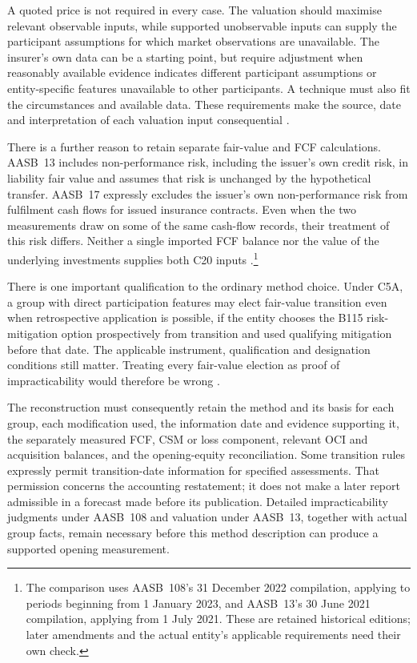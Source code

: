 A quoted price is not required in every case. The valuation should maximise
relevant observable inputs, while supported unobservable inputs can supply
the participant assumptions for which market observations are unavailable.
The insurer's own data can be a starting point, but require adjustment when
reasonably available evidence indicates different participant assumptions or
entity-specific features unavailable to other participants. A technique must
also fit the circumstances and available data. These requirements make the
source, date and interpretation of each valuation input consequential
\citep[paragraphs~61--67 and 87--89]{aasb13comp2021}.

There is a further reason to retain separate fair-value and FCF calculations.
AASB~13 includes non-performance risk, including the issuer's own credit
risk, in liability fair value and assumes that risk is unchanged by the
hypothetical transfer. AASB~17 expressly excludes the issuer's own
non-performance risk from fulfilment cash flows for issued insurance contracts.
Even when the two measurements draw on some of the same cash-flow records,
their treatment of this risk differs. Neither a single imported FCF balance
nor the value of the underlying investments supplies both C20 inputs
\citep[paragraphs~42--44]{aasb13comp2021}
\citep[paragraph~31]{aasb17}.\footnote{The comparison uses AASB~108's
31 December 2022 compilation, applying to periods beginning from 1 January
2023, and AASB~13's 30 June 2021 compilation, applying from 1 July 2021.
These are retained historical editions; later amendments and the actual
entity's applicable requirements need their own check.}

\clearpage
There is one important qualification to the ordinary method choice. Under
C5A, a group with direct participation features may elect fair-value transition
even when retrospective application is possible, if the entity chooses the
B115 risk-mitigation option prospectively from transition and used qualifying
mitigation before that date. The applicable instrument, qualification and
designation conditions still matter. Treating every fair-value election as
proof of impracticability would therefore be wrong
\citep[paragraphs C3(b), C5A and B115--B118]{aasb17}.

The reconstruction must consequently retain the method and its basis for each
group, each modification used, the information date and evidence supporting
it, the separately measured FCF, CSM or loss component, relevant OCI and
acquisition balances, and the opening-equity reconciliation. Some transition
rules expressly permit transition-date information for specified assessments.
That permission concerns the accounting restatement; it does not make a later
report admissible in a forecast made before its publication. Detailed
impracticability judgments under AASB~108 and valuation under AASB~13, together
with actual group facts, remain necessary before this method description can
produce a supported opening measurement.


